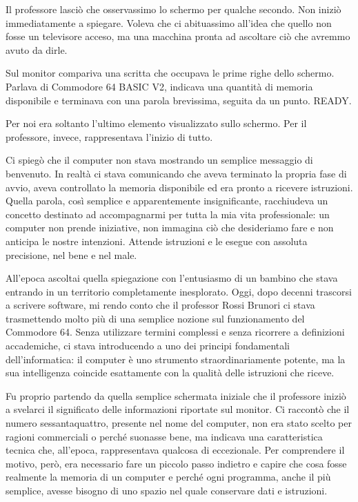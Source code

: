 \documentclass{article}
\begin{document}
Il professore lasciò che osservassimo lo schermo per qualche secondo. Non iniziò immediatamente a spiegare. Voleva che
ci abituassimo all'idea che quello non fosse un televisore acceso, ma una macchina pronta ad ascoltare ciò che avremmo
avuto da dirle.

Sul monitor compariva una scritta che occupava le prime righe dello schermo. Parlava di Commodore 64 BASIC V2, indicava
una quantità di memoria disponibile e terminava con una parola brevissima, seguita da un punto. READY.

Per noi era soltanto l'ultimo elemento visualizzato sullo schermo. Per il professore, invece, rappresentava l'inizio di
tutto.

Ci spiegò che il computer non stava mostrando un semplice messaggio di benvenuto. In realtà ci stava comunicando che
aveva terminato la propria fase di avvio, aveva controllato la memoria disponibile ed era pronto a ricevere istruzioni.
Quella parola, così semplice e apparentemente insignificante, racchiudeva un concetto destinato ad accompagnarmi per
tutta la mia vita professionale: un computer non prende iniziative, non immagina ciò che desideriamo fare e non
anticipa le nostre intenzioni. Attende istruzioni e le esegue con assoluta precisione, nel bene e nel male.

All'epoca ascoltai quella spiegazione con l'entusiasmo di un bambino che stava entrando in un territorio completamente
inesplorato. Oggi, dopo decenni trascorsi a scrivere software, mi rendo conto che il professor Rossi Brunori ci stava
trasmettendo molto più di una semplice nozione sul funzionamento del Commodore 64. Senza utilizzare termini complessi e
senza ricorrere a definizioni accademiche, ci stava introducendo a uno dei principi fondamentali dell'informatica: il
computer è uno strumento straordinariamente potente, ma la sua intelligenza coincide esattamente con la qualità delle
istruzioni che riceve.

Fu proprio partendo da quella semplice schermata iniziale che il professore iniziò a svelarci il significato delle
informazioni riportate sul monitor. Ci raccontò che il numero sessantaquattro, presente nel nome del computer, non era
stato scelto per ragioni commerciali o perché suonasse bene, ma indicava una caratteristica tecnica che, all'epoca,
rappresentava qualcosa di eccezionale. Per comprendere il motivo, però, era necessario fare un piccolo passo indietro e
capire che cosa fosse realmente la memoria di un computer e perché ogni programma, anche il più semplice, avesse
bisogno di uno spazio nel quale conservare dati e istruzioni.
\end{document}
